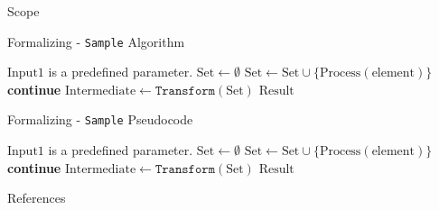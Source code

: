 				
\begin{frame}[label=scope]{Scope \hyperlink{objectives}{}}
	\note{}
\end{frame}

\begin{frame}[label=algo1]{Formalizing - \texttt{Sample} Algorithm \hyperlink{process1}{}}
	\begin{algorithm}[H]
		\small
		\caption{$(\text{Result}) \gets \texttt{Sample}(\text{Input1})$}
		\label{alg:algo1}
		\begin{algorithmic}[1]
			\Require $\text{Input1}$ is a predefined parameter.
			\State $\text{Set} \gets \emptyset$
			\State $\text{Set} \gets \text{Set} \cup \{\text{Process}(\text{element})\}$
			\Else
			\State \textbf{continue}
			\EndIf
			\EndFor
			\State $\text{Intermediate} \gets \texttt{Transform}(\text{Set})$
			\State \Return $\text{Result}$
		\end{algorithmic}
	\end{algorithm}
	\note{}
\end{frame}
	
\begin{frame}[label=pseudocode1]{Formalizing - \texttt{Sample} Pseudocode \hyperlink{process1}{}}
	\begin{algorithm}[H]
		\small
		\caption{$(\text{Result}) \gets \texttt{Sample}(\text{Input1})$}
		\label{alg:pseudocode1}
		\begin{algorithmic}[1]
			\Require $\text{Input1}$ is a predefined parameter.
			\State $\text{Set} \gets \emptyset$
			\State $\text{Set} \gets \text{Set} \cup \{\text{Process}(\text{element})\}$
			\Else
			\State \textbf{continue}
			\EndIf
			\EndFor
			\State $\text{Intermediate} \gets \texttt{Transform}(\text{Set})$
			\State \Return $\text{Result}$
		\end{algorithmic}
	\end{algorithm}
	\note{}
\end{frame}



\begin{frame}{References}
	\printbibliography[heading=none]
\end{frame}